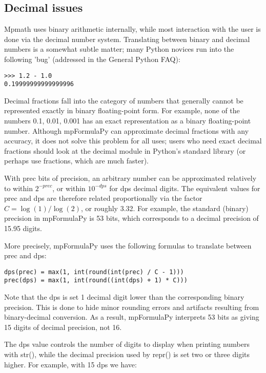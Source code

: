 \subsection{Decimal issues}

Mpmath uses binary arithmetic internally, while most interaction with the user is done via the decimal number system. Translating between binary and decimal numbers is a somewhat subtle matter; many Python novices run into the following 'bug' (addressed in the General
Python FAQ):

\begin{lstlisting}
>>> 1.2 - 1.0
0.19999999999999996
\end{lstlisting}


Decimal fractions fall into the category of numbers that generally cannot be represented exactly in binary floating-point form. For example, none of the numbers 0.1, 0.01, 0.001 has an exact representation as a binary floating-point number. Although mpFormulaPy can
approximate decimal fractions with any accuracy, it does not solve this problem for all uses; users who need exact decimal fractions should look at the decimal module in Python's standard library (or perhaps use fractions, which are much faster).

\vpara
With prec bits of precision, an arbitrary number can be approximated relatively to within $2^{-prec}$, or within $10^{-dps}$ for dps decimal digits. The equivalent values for prec and dps are therefore related proportionally via the factor $C=\log(1)/\log(2)$, or roughly 3.32. For
example, the standard (binary) precision in mpFormulaPy is 53 bits, which corresponds to a decimal precision of 15.95 digits.

\vpara
More precisely, mpFormulaPy uses the following formulas to translate between prec and dps:

\begin{lstlisting}
dps(prec) = max(1, int(round(int(prec) / C - 1)))
prec(dps) = max(1, int(round((int(dps) + 1) * C)))
\end{lstlisting}

Note that the dps is set 1 decimal digit lower than the corresponding binary precision. This is done to hide minor rounding errors and artifacts resulting from binary-decimal conversion.
As a result, mpFormulaPy interprets 53 bits as giving 15 digits of decimal precision, not 16.

\vpara
The dps value controls the number of digits to display when printing numbers with str(),
while the decimal precision used by repr() is set two or three digits higher. For example,
with 15 dps we have:

